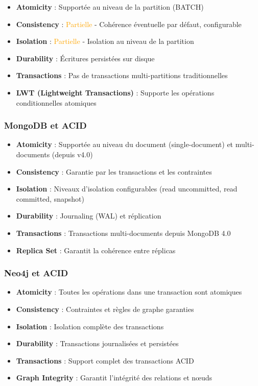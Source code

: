 \documentclass[11pt,a4paper]{article}
\begin{document}
\begin{itemize}
    \item \textbf{Atomicity} : \checkmark Supportée au niveau de la partition (BATCH)
    \item \textbf{Consistency} : \textcolor{orange}{Partielle} - Cohérence éventuelle par défaut, configurable
    \item \textbf{Isolation} : \textcolor{orange}{Partielle} - Isolation au niveau de la partition
    \item \textbf{Durability} : \checkmark Écritures persistées sur disque
    \item \textbf{Transactions} : Pas de transactions multi-partitions traditionnelles
    \item \textbf{LWT (Lightweight Transactions)} : Supporte les opérations conditionnelles atomiques
\end{itemize}

\subsubsection{MongoDB et ACID}

\begin{itemize}
    \item \textbf{Atomicity} : \checkmark Supportée au niveau du document (single-document) et multi-documents (depuis v4.0)
    \item \textbf{Consistency} : \checkmark Garantie par les transactions et les contraintes
    \item \textbf{Isolation} : \checkmark Niveaux d'isolation configurables (read uncommitted, read committed, snapshot)
    \item \textbf{Durability} : \checkmark Journaling (WAL) et réplication
    \item \textbf{Transactions} : Transactions multi-documents depuis MongoDB 4.0
    \item \textbf{Replica Set} : Garantit la cohérence entre réplicas
\end{itemize}

\subsubsection{Neo4j et ACID}

\begin{itemize}
    \item \textbf{Atomicity} : \checkmark Toutes les opérations dans une transaction sont atomiques
    \item \textbf{Consistency} : \checkmark Contraintes et règles de graphe garanties
    \item \textbf{Isolation} : \checkmark Isolation complète des transactions
    \item \textbf{Durability} : \checkmark Transactions journalisées et persistées
    \item \textbf{Transactions} : Support complet des transactions ACID
    \item \textbf{Graph Integrity} : Garantit l'intégrité des relations et nœuds
\end{itemize}
\end{document}

